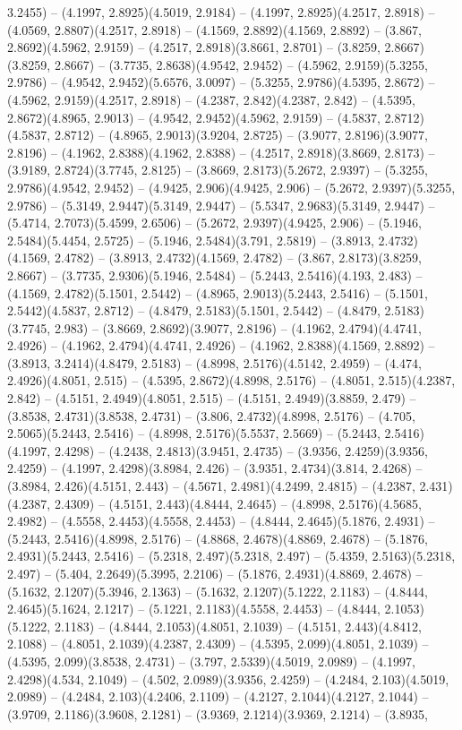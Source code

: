3.2455) -- (4.1997, 2.8925)(4.5019, 2.9184) -- (4.1997, 2.8925)(4.2517, 2.8918) -- (4.0569, 2.8807)(4.2517, 2.8918) -- (4.1569, 2.8892)(4.1569, 2.8892) -- (3.867, 2.8692)(4.5962, 2.9159) -- (4.2517, 2.8918)(3.8661, 2.8701) -- (3.8259, 2.8667)(3.8259, 2.8667) -- (3.7735, 2.8638)(4.9542, 2.9452) -- (4.5962, 2.9159)(5.3255, 2.9786) -- (4.9542, 2.9452)(5.6576, 3.0097) -- (5.3255, 2.9786)(4.5395, 2.8672) -- (4.5962, 2.9159)(4.2517, 2.8918) -- (4.2387, 2.842)(4.2387, 2.842) -- (4.5395, 2.8672)(4.8965, 2.9013) -- (4.9542, 2.9452)(4.5962, 2.9159) -- (4.5837, 2.8712)(4.5837, 2.8712) -- (4.8965, 2.9013)(3.9204, 2.8725) -- (3.9077, 2.8196)(3.9077, 2.8196) -- (4.1962, 2.8388)(4.1962, 2.8388) -- (4.2517, 2.8918)(3.8669, 2.8173) -- (3.9189, 2.8724)(3.7745, 2.8125) -- (3.8669, 2.8173)(5.2672, 2.9397) -- (5.3255, 2.9786)(4.9542, 2.9452) -- (4.9425, 2.906)(4.9425, 2.906) -- (5.2672, 2.9397)(5.3255, 2.9786) -- (5.3149, 2.9447)(5.3149, 2.9447) -- (5.5347, 2.9683)(5.3149, 2.9447) -- (5.4714, 2.7073)(5.4599, 2.6506) -- (5.2672, 2.9397)(4.9425, 2.906) -- (5.1946, 2.5484)(5.4454, 2.5725) -- (5.1946, 2.5484)(3.791, 2.5819) -- (3.8913, 2.4732)(4.1569, 2.4782) -- (3.8913, 2.4732)(4.1569, 2.4782) -- (3.867, 2.8173)(3.8259, 2.8667) -- (3.7735, 2.9306)(5.1946, 2.5484) -- (5.2443, 2.5416)(4.193, 2.483) -- (4.1569, 2.4782)(5.1501, 2.5442) -- (4.8965, 2.9013)(5.2443, 2.5416) -- (5.1501, 2.5442)(4.5837, 2.8712) -- (4.8479, 2.5183)(5.1501, 2.5442) -- (4.8479, 2.5183)(3.7745, 2.983) -- (3.8669, 2.8692)(3.9077, 2.8196) -- (4.1962, 2.4794)(4.4741, 2.4926) -- (4.1962, 2.4794)(4.4741, 2.4926) -- (4.1962, 2.8388)(4.1569, 2.8892) -- (3.8913, 3.2414)(4.8479, 2.5183) -- (4.8998, 2.5176)(4.5142, 2.4959) -- (4.474, 2.4926)(4.8051, 2.515) -- (4.5395, 2.8672)(4.8998, 2.5176) -- (4.8051, 2.515)(4.2387, 2.842) -- (4.5151, 2.4949)(4.8051, 2.515) -- (4.5151, 2.4949)(3.8859, 2.479) -- (3.8538, 2.4731)(3.8538, 2.4731) -- (3.806, 2.4732)(4.8998, 2.5176) -- (4.705, 2.5065)(5.2443, 2.5416) -- (4.8998, 2.5176)(5.5537, 2.5669) -- (5.2443, 2.5416)(4.1997, 2.4298) -- (4.2438, 2.4813)(3.9451, 2.4735) -- (3.9356, 2.4259)(3.9356, 2.4259) -- (4.1997, 2.4298)(3.8984, 2.426) -- (3.9351, 2.4734)(3.814, 2.4268) -- (3.8984, 2.426)(4.5151, 2.443) -- (4.5671, 2.4981)(4.2499, 2.4815) -- (4.2387, 2.431)(4.2387, 2.4309) -- (4.5151, 2.443)(4.8444, 2.4645) -- (4.8998, 2.5176)(4.5685, 2.4982) -- (4.5558, 2.4453)(4.5558, 2.4453) -- (4.8444, 2.4645)(5.1876, 2.4931) -- (5.2443, 2.5416)(4.8998, 2.5176) -- (4.8868, 2.4678)(4.8869, 2.4678) -- (5.1876, 2.4931)(5.2443, 2.5416) -- (5.2318, 2.497)(5.2318, 2.497) -- (5.4359, 2.5163)(5.2318, 2.497) -- (5.404, 2.2649)(5.3995, 2.2106) -- (5.1876, 2.4931)(4.8869, 2.4678) -- (5.1632, 2.1207)(5.3946, 2.1363) -- (5.1632, 2.1207)(5.1222, 2.1183) -- (4.8444, 2.4645)(5.1624, 2.1217) -- (5.1221, 2.1183)(4.5558, 2.4453) -- (4.8444, 2.1053)(5.1222, 2.1183) -- (4.8444, 2.1053)(4.8051, 2.1039) -- (4.5151, 2.443)(4.8412, 2.1088) -- (4.8051, 2.1039)(4.2387, 2.4309) -- (4.5395, 2.099)(4.8051, 2.1039) -- (4.5395, 2.099)(3.8538, 2.4731) -- (3.797, 2.5339)(4.5019, 2.0989) -- (4.1997, 2.4298)(4.534, 2.1049) -- (4.502, 2.0989)(3.9356, 2.4259) -- (4.2484, 2.103)(4.5019, 2.0989) -- (4.2484, 2.103)(4.2406, 2.1109) -- (4.2127, 2.1044)(4.2127, 2.1044) -- (3.9709, 2.1186)(3.9608, 2.1281) -- (3.9369, 2.1214)(3.9369, 2.1214) -- (3.8935, 